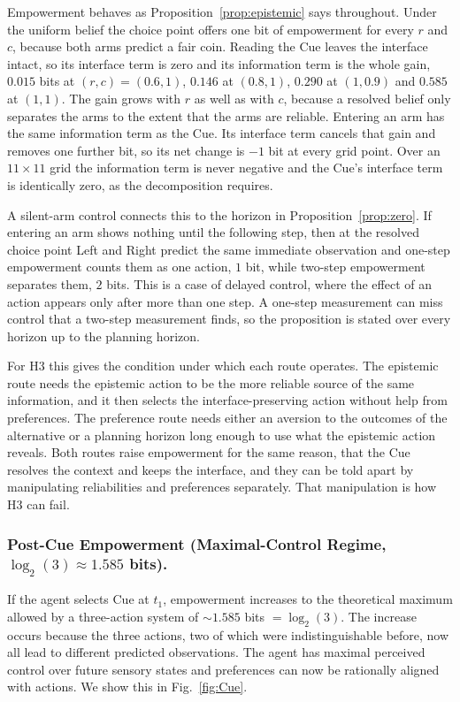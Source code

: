 \documentclass[pdflatex,sn-apa]{sn-jnl}%
\theoremstyle{definition}
\begin{document}
Empowerment behaves as Proposition~\ref{prop:epistemic} says throughout. Under the uniform belief the choice point offers one bit of empowerment for every $r$ and $c$, because both arms predict a fair coin. Reading the Cue leaves the interface intact, so its interface term is zero and its information term is the whole gain, $0.015$ bits at $(r, c) = (0.6, 1)$, $0.146$ at $(0.8, 1)$, $0.290$ at $(1, 0.9)$ and $0.585$ at $(1, 1)$. The gain grows with $r$ as well as with $c$, because a resolved belief only separates the arms to the extent that the arms are reliable. Entering an arm has the same information term as the Cue. Its interface term cancels that gain and removes one further bit, so its net change is $-1$ bit at every grid point. Over an $11 \times 11$ grid the information term is never negative and the Cue's interface term is identically zero, as the decomposition requires.

A silent-arm control connects this to the horizon in Proposition~\ref{prop:zero}. If entering an arm shows nothing until the following step, then at the resolved choice point Left and Right predict the same immediate observation and one-step empowerment counts them as one action, $1$ bit, while two-step empowerment separates them, $2$ bits. This is a case of delayed control, where the effect of an action appears only after more than one step. A one-step measurement can miss control that a two-step measurement finds, so the proposition is stated over every horizon up to the planning horizon.

For H3 this gives the condition under which each route operates. The epistemic route needs the epistemic action to be the more reliable source of the same information, and it then selects the interface-preserving action without help from preferences. The preference route needs either an aversion to the outcomes of the alternative or a planning horizon long enough to use what the epistemic action reveals. Both routes raise empowerment for the same reason, that the Cue resolves the context and keeps the interface, and they can be told apart by manipulating reliabilities and preferences separately. That manipulation is how H3 can fail.

\subsubsection{Post-Cue Empowerment (Maximal-Control Regime, \texorpdfstring{$\log_2(3)\approx 1.585$}{log2 3 = 1.585} bits).}

If the agent selects Cue at $t_1$, empowerment increases to the theoretical maximum allowed by a three-action system of ${\sim}1.585$ bits $= \log_2(3)$. The increase occurs because the three actions, two of which were indistinguishable before, now all lead to different predicted observations. The agent has maximal perceived control over future sensory states and preferences can now be rationally aligned with actions. We show this in Fig.~\ref{fig:Cue}.
\end{document}
